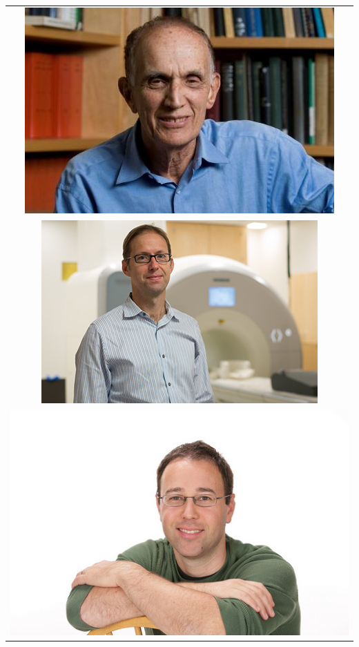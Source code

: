 \documentclass{beamer}
\begin{document}
\begin{frame}
\begin{center}
\begin{tabular}{c}
\includegraphics[scale = 0.7]{2014_Efron-indoors.jpg}\\
\includegraphics[scale = 0.16]{poldrack_photo2_400.jpg}\\
\includegraphics[scale = 0.16]{tsachypic.jpg}
\end{tabular}
\end{center}
\end{frame}
\end{document}
